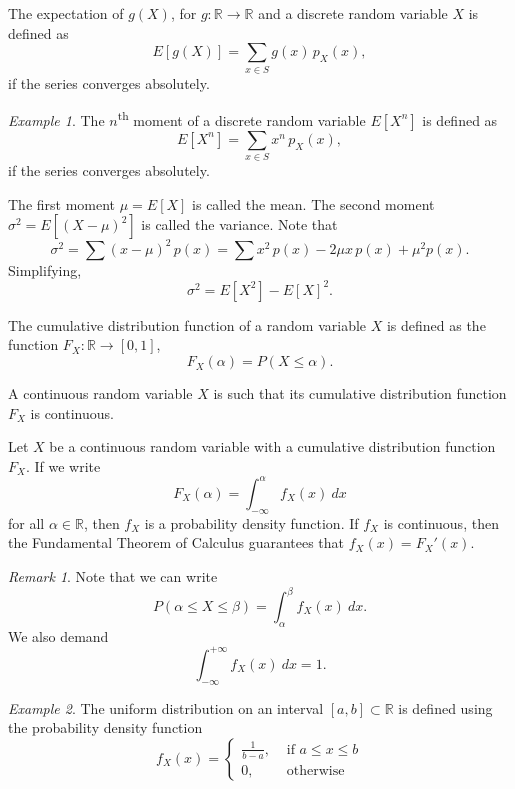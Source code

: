 \documentclass[11pt]{article}
\def\R{\mathbb{R}}
\newcommand\E[1]{E\left[#1\right]}
\theoremstyle{definition}
\theoremstyle{remark}
\newtheorem*{remark}{Remark}
\newtheorem*{example}{Example}
\numberwithin{equation}{module}
\begin{document}
    \begin{definition}[Expectation]
        The expectation of $g(X)$, for $g\colon \R \to \R$ and a discrete random
        variable $X$ is defined as \[
            \E{g(X)} = \sum_{x \in S} g(x)\,p_X(x),
        \] if the series converges absolutely.
    \end{definition}
    \begin{example}
        The $n$\textsuperscript{th} moment of a discrete random variable $\E{X^n}$
        is defined as \[
            \E{X^n} = \sum_{x \in S} x^n\,p_X(x),
        \] if the series converges absolutely.

        The first moment $\mu = \E{X}$ is called the mean.
        The second moment $\sigma^2 = \E{(X - \mu)^2}$ is called the variance.
        Note that \[
            \sigma^2 = \sum (x - \mu)^2\, p(x) = \sum x^2\,p(x) - 2\mu x\,p(x) +
            \mu^2 p(x).
        \] Simplifying, \[
            \sigma^2 = \E{X^2} - \E{X}^2.
        \] 
    \end{example}

    \begin{definition}
        The cumulative distribution function of a random variable $X$ is
        defined as the function $F_X\colon \R \to [0, 1]$, \[
            F_X(\alpha) = P(X \leq \alpha).
        \] 
    \end{definition}

    \begin{definition}
        A continuous random variable $X$ is such that its cumulative distribution
        function $F_X$ is continuous.
    \end{definition}

    \begin{definition}
        Let $X$ be a continuous random variable with a cumulative distribution
        function $F_X$. If we write \[
            F_X(\alpha) = \int_{-\infty}^\alpha f_X(x)\:dx
        \] for all $\alpha \in \R$, then $f_X$ is a probability density function.
        If $f_X$ is continuous, then the Fundamental Theorem of Calculus guarantees
        that $f_X(x) = F_X'(x)$.
        \begin{remark}
            Note that we can write \[
                P(\alpha \leq X \leq \beta) = \int_\alpha^\beta f_X(x)\:dx.
            \] We also demand \[
                \int_{-\infty}^{+\infty} f_X(x) \:dx = 1.
            \] 
        \end{remark}
    \end{definition}
    \begin{example}
        The uniform distribution on an interval $[a, b] \subset \R$ is defined using
        the probability density function \[
            f_X(x) = \begin{cases}
                \frac{1}{b - a}, &\text{ if }a \leq x \leq b \\
                0, &\text{ otherwise }
            \end{cases}
        \]
    \end{example}
\end{document}
